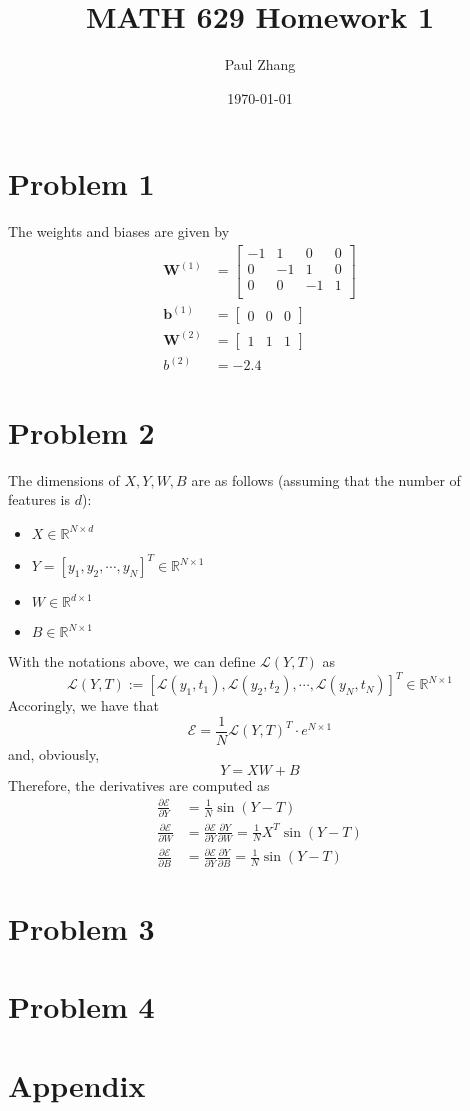 \documentclass{article}
\title{\Large\bf MATH 629 Homework 1}
\author{\normalsize Paul Zhang}
\date{\normalsize\today}
\begin{document}
\maketitle
\small
\section*{Problem 1}
The weights and biases are given by 
\begin{align*}
    \mathbf{W}^{(1)} & = \begin{bmatrix}
        -1 & 1 & 0 & 0 \\
        0 & -1 & 1 & 0 \\
        0 & 0 & -1 & 1 \\
    \end{bmatrix} \\
    \mathbf{b}^{(1)} & = \begin{bmatrix} 0 & 0 & 0\end{bmatrix} \\
    \mathbf{W}^{(2)} & = \begin{bmatrix} 1 & 1 & 1 \end{bmatrix} \\
    b^{(2)} & = -2.4
\end{align*}

\section*{Problem 2}
The dimensions of $X, Y, W, B$ are as follows (assuming that the number of features is $d$):
\begin{itemize}
    \item $X \in \mathbb{R}^{N \times d}$ 
    \item $Y = [y_1, y_2, \cdots, y_N]^T \in \mathbb{R}^{N\times 1}$
    \item $W \in \mathbb{R}^{d\times 1}$
    \item $B \in \mathbb{R}^{N\times 1}$
\end{itemize}
With the notations above, we can define $\mathcal{L}(Y ,T)$ as
$$ \mathcal{L}(Y, T) := [\mathcal{L}(y_1, t_1), \mathcal{L}(y_2, t_2), \cdots, \mathcal{L}(y_N, t_N)]^T 
\in \mathbb{R}^{N\times 1}$$
Accoringly, we have that
$$ \mathcal{E} = \frac{1}{N} \mathcal{L}(Y, T)^T \cdot e^{N\times 1} $$
and, obviously, 
$$ Y = XW + B $$
Therefore, the derivatives are computed as 
\begin{align*}
    \frac{\partial \mathcal{E}}{\partial Y} & = \frac{1}{N} \sin(Y - T) \\
    \frac{\partial \mathcal{E}}{\partial W} & = \frac{\partial \mathcal{E}}{\partial Y} \frac{\partial Y}
    {\partial W} = \frac{1}{N} X^T \sin(Y - T) \\
    \frac{\partial \mathcal{E}}{\partial B} & = \frac{\partial \mathcal{E}}{\partial Y} \frac{\partial Y}
    {\partial B} = \frac{1}{N} \sin(Y - T)
\end{align*}

\section*{Problem 3}

\section*{Problem 4}


\section*{Appendix}
\end{document}
